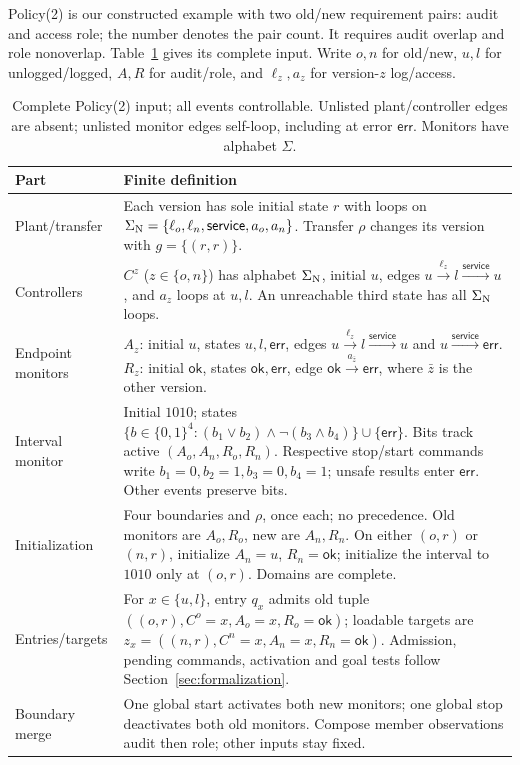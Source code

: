Policy(2) is our constructed example with two old/new requirement pairs: audit and access role; the number denotes the pair count. It requires audit overlap and role nonoverlap. Table~\ref{tab:policy-finite-c13} gives its complete input. Write $o,n$ for old/new, $u,l$ for unlogged/logged, $A,R$ for audit/role, and $\ell_z,a_z$ for version-$z$ log/access.

\begin{table}[!htbp]
\centering\small
\caption{Complete Policy(2) input; all events controllable. Unlisted plant/controller edges are absent; unlisted monitor edges self-loop, including at error $\mathsf{err}$. Monitors have alphabet $\Sigma$.}
\label{tab:policy-finite-c13}
\begin{tabular}{@{}p{.16\linewidth}p{.78\linewidth}@{}}\toprule
Part & Finite definition\\\midrule
Plant/transfer & Each version has sole initial state $r$ with loops on $\Sigma_{\mathrm{N}}=\{\ell_o,\ell_n,\mathsf{service},a_o,a_n\}$. Transfer $\rho$ changes its version with $g=\{(r,r)\}$.\\
Controllers & $C^z$ ($z\in\{o,n\}$) has alphabet $\Sigma_{\mathrm{N}}$, initial $u$, edges $u\xrightarrow{\ell_z}l\xrightarrow{\mathsf{service}}u$, and $a_z$ loops at $u,l$. An unreachable third state has all $\Sigma_{\mathrm{N}}$ loops.\\
Endpoint monitors & $A_z$: initial $u$, states $u,l,\mathsf{err}$, edges $u\xrightarrow{\ell_z}l\xrightarrow{\mathsf{service}}u$ and $u\xrightarrow{\mathsf{service}}\mathsf{err}$. $R_z$: initial $\mathsf{ok}$, states $\mathsf{ok},\mathsf{err}$, edge $\mathsf{ok}\xrightarrow{a_{\bar z}}\mathsf{err}$, where $\bar z$ is the other version.\\
Interval monitor & Initial $1010$; states $\{b\in\{0,1\}^4:(b_1\lor b_2)\land\neg(b_3\land b_4)\}\cup\{\mathsf{err}\}$. Bits track active $(A_o,A_n,R_o,R_n)$. Respective stop/start commands write $b_1=0,b_2=1,b_3=0,b_4=1$; unsafe results enter $\mathsf{err}$. Other events preserve bits.\\
Initialization & Four boundaries and $\rho$, once each; no precedence. Old monitors are $A_o,R_o$, new are $A_n,R_n$. On either $(o,r)$ or $(n,r)$, initialize $A_n=u$, $R_n=\mathsf{ok}$; initialize the interval to $1010$ only at $(o,r)$. Domains are complete.\\
Entries/targets & For $x\in\{u,l\}$, entry $q_x$ admits old tuple $((o,r),C^o=x,A_o=x,R_o=\mathsf{ok})$; loadable targets are $z_x=((n,r),C^n=x,A_n=x,R_n=\mathsf{ok})$. Admission, pending commands, activation and goal tests follow Section~\ref{sec:formalization}.\\
Boundary merge & One global start activates both new monitors; one global stop deactivates both old monitors. Compose member observations audit then role; other inputs stay fixed.\\\bottomrule
\end{tabular}
\end{table}

